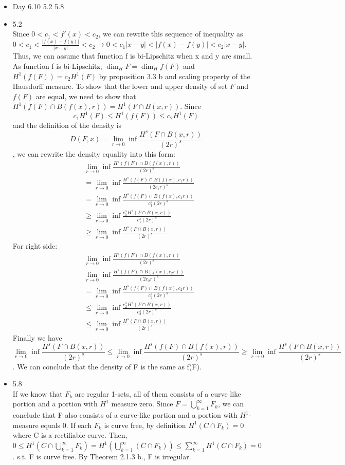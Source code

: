 \documentclass{article}
\begin{document}
\begin{itemize}
\item Day 6.10 5.2 5.8\\ 
\item 5.2\\
Since $0<c_1<f'(x)<c_2$, we can rewrite this sequence of inequality as $0<c_1<\frac{|f(x)-f(y)|}{|x-y|}<c_2 \rightarrow 0 < c_1|x-y|<|f(x)-f(y)|<c_2|x-y|$. Thus, we can assume that function f is bi-Lipschitz when x and y are small. As function f is bi-Lipschitz, $\dim_H F = \dim_H f(F)$ and $H^1(f(F)) = c_2H^1(F)$ by proposition 3.3 b and scaling property of the Hausdorff measure. To show that the lower and upper density of set $F$ and $f(F)$ are equal, we need to show that $H^1(f(F) \cap B(f(x),r)) = H^1(F\cap B(x,r))$. Since \[c_1H^1(F)\leq H^1(f(F))\leq c_2H^1(F)\] and the definition of the density is \[D(F,x) = \lim_{r \to 0}\inf{\frac{H^s(F \cap B(x,r))}{(2r)^s}}\], we can rewrite the density equality into this form:
\begin{align*}
&\lim_{r \to 0}\inf{\frac{H^s(f(F) \cap B(f(x),r))}{(2r)^s}}\\
&=\lim_{r \to 0}\inf{\frac{H^s(f(F) \cap B(f(x),c_1r))}{(2c_1r)^s}}\\
&=\lim_{r \to 0}\inf{\frac{H^s(f(F) \cap B(f(x),c_1r))}{c_1^s(2r)^s}}\\
&\geq \lim_{r \to 0}\inf{\frac{c_1^s H^s(F \cap B(x,r))}{c_1^s(2r)^s}}\\
&\geq \lim_{r \to 0}\inf{\frac{ H^s(F \cap B(x,r))}{(2r)^s}}
\end{align*}
For right side:
\begin{align*}
&\lim_{r \to 0}\inf{\frac{H^s(f(F) \cap B(f(x),r))}{(2r)^s}}\\
&\lim_{r \to 0}\inf{\frac{H^s(f(F) \cap B(f(x),c_2r))}{(2c_2r)^s}}\\
&=\lim_{r \to 0}\inf{\frac{H^s(f(F) \cap B(f(x),c_2r))}{c_2^s(2r)^s}}\\
&\leq \lim_{r \to 0}\inf{\frac{c_2^s H^s(F \cap B(x,r))}{c_2^s(2r)^s}}\\
&\leq \lim_{r \to 0}\inf{\frac{ H^s(F \cap B(x,r))}{(2r)^s}}
\end{align*}
Finally we have \[\lim_{r \to 0}\inf{\frac{ H^s(F \cap B(x,r))}{(2r)^s}} \leq \lim_{r \to 0}\inf{\frac{H^s(f(F) \cap B(f(x),r))}{(2r)^s}} \geq \lim_{r \to 0}\inf{\frac{ H^s(F \cap B(x,r))}{(2r)^s}}\]. We can conclude that the density of F is the same as f(F).
\item 5.8\\
If we know that $F_k$ are regular 1-sets, all of them consists of a curve like portion and a portion with $H^1$ measure zero. Since $F = \bigcup_{k=1}^{\infty} F_k$, we can conclude that F also consists of a curve-like portion and a portion with $H^1$-measure equals 0. If each $F_k$ is curve free, by definition $H^1(C \cap F_k) = 0$ where C is a rectifiable curve. Then, $0 \leq H^1(C \cap \bigcup_{k=1}^\infty F_k) = H^1(\bigcup_{k=1}^\infty(C \cap F_k)) \leq \sum_{k=1}^\infty H^1(C \cap F_k) = 0$. s.t. F is curve free. By Theorem 2.1.3 b., F is irregular. \\


\end{itemize}
\end{document}
